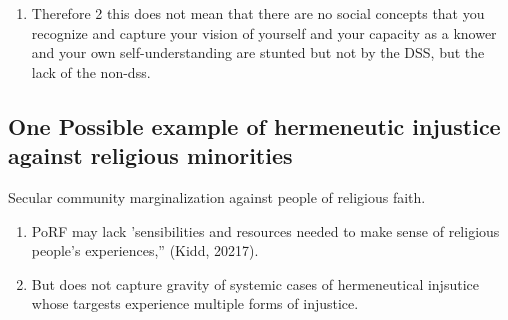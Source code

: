 \documentclass[
  letterpaper,
  DIV=11,
  numbers=noendperiod]{scrreprt}
\providecommand{\tightlist}{%
  \setlength{\itemsep}{0pt}\setlength{\parskip}{0pt}}\usepackage{longtable,booktabs,array}
\begin{document}
\begin{tcolorbox}[enhanced jigsaw, arc=.35mm, breakable, rightrule=.15mm, colback=white, colframe=quarto-callout-important-color-frame, bottomrule=.15mm, leftrule=.75mm, opacityback=0, toprule=.15mm, left=2mm]
\begin{tcolorbox}[enhanced jigsaw, arc=.35mm, breakable, rightrule=.15mm, colback=white, colframe=quarto-callout-tip-color-frame, bottomrule=.15mm, leftrule=.75mm, opacityback=0, toprule=.15mm, left=2mm]
\begin{enumerate}
  \begin{enumerate}
  \def\labelenumii{\arabic{enumii}.}
  \tightlist
  \item
    It is possible that while you are excluded from a dss, a non-dss,
    one that includes you and does not distort your experiences, could
    still capture a vision of yourself, and your capacity as a knower
    and fortifying your self-understanding.
  \item
    So while a person is excluded from a dss, they could have their
    capacity as a knower fortified by a non-dss.
  \end{enumerate}
\item
  Therefore 2 this does not mean that there are no social concepts that
  you recognize and capture your vision of yourself and your capacity as
  a knower and your own self-understanding are stunted but not by the
  DSS, but the lack of the non-dss.
\end{enumerate}

\subsection{One Possible example of hermeneutic injustice against
religious
minorities}\label{one-possible-example-of-hermeneutic-injustice-against-religious-minorities}

Secular community marginalization against people of religious faith.

\begin{enumerate}
\def\labelenumi{\arabic{enumi}.}
\tightlist
\item
  PoRF may lack 'sensibilities and resources needed to make sense of
  religious people's experiences,'' (Kidd, 20217).
\item
  But does not capture gravity of systemic cases of hermeneutical
  injsutice whose targests experience multiple forms of injustice.


\end{enumerate}
\end{tcolorbox}
\end{tcolorbox}
\end{document}
